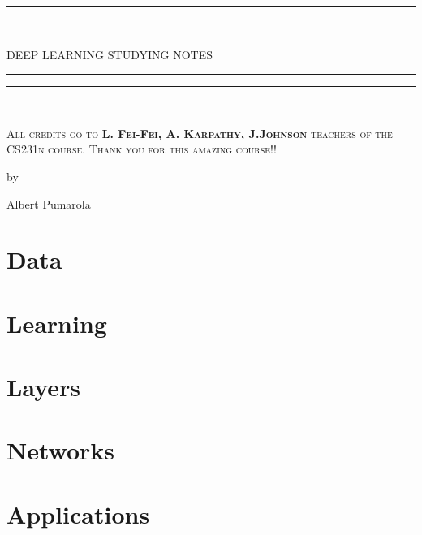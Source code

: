 \documentclass[a4paper, 11pt, twoside, openright]{Thesis}  %
\newcommand*{\titleGP}{\begingroup %
\centering %
\vspace*{\baselineskip} %

\rule{\textwidth}{1.6pt}\vspace*{-\baselineskip}\vspace*{2pt} %
\rule{\textwidth}{0.4pt}\\[\baselineskip] %

{\LARGE DEEP LEARNING STUDYING NOTES}\\[0.2\baselineskip] %

\rule{\textwidth}{0.4pt}\vspace*{-\baselineskip}\vspace{3.2pt} %
\rule{\textwidth}{1.6pt}\\[\baselineskip] %

\vfill

\scshape %
{\Large All credits go to \textbf{L. Fei-Fei, A. Karpathy, J.Johnson} teachers of the CS231n course. Thank you for this amazing course!!}\\[\baselineskip] %

\vfill

 by \\[\baselineskip]
{\Large Albert Pumarola\par} %

\endgroup}
\begin{document}
\pagestyle{empty} %

\titleGP %

\tableofcontents



\part{Data}
 


\part{Learning}












\part{Layers}








\part{Networks}








 


\part{Applications}




\backmatter
\nocite{*}
\label{Bibliography}
\end{document}
